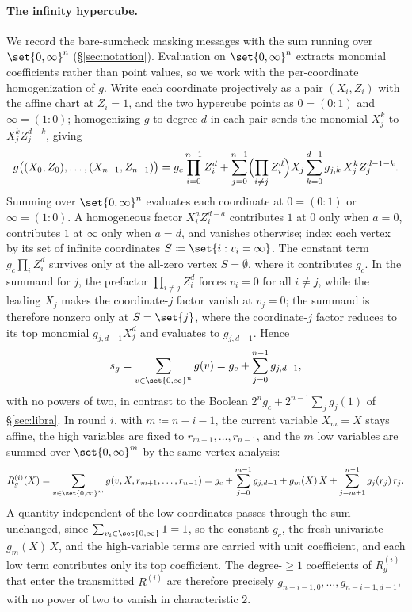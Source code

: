 \documentclass{article}
\theoremstyle{definition}
\begin{document}
\paragraph{The infinity hypercube.}
We record the bare-sumcheck masking messages with the sum running over $\set{0, \infty}^n$ (\S\ref{sec:notation}). Evaluation on $\set{0, \infty}^n$ extracts monomial coefficients rather than point values, so we work with the per-coordinate homogenization of $g$. Write each coordinate projectively as a pair $(X_i, Z_i)$ with the affine chart at $Z_i = 1$, and the two hypercube points as $0 = (0 : 1)$ and $\infty = (1 : 0)$; homogenizing $g$ to degree $d$ in each pair sends the monomial $X_j^{k}$ to $X_j^{k} Z_j^{d - k}$, giving
\[
  g\bigl( (X_0, Z_0), \ldots, (X_{n - 1}, Z_{n - 1}) \bigr) = g_c \prod_{i = 0}^{n - 1} Z_i^{d} + \sum_{j = 0}^{n - 1} \Bigl( \prod_{i \neq j} Z_i^{d} \Bigr) X_j \sum_{k = 0}^{d-1} g_{j, k}\, X_j^k Z_j^{d - 1 - k}.
\]
Summing over $\set{0, \infty}^n$ evaluates each coordinate at $0 = (0 : 1)$ or $\infty = (1 : 0)$. A homogeneous factor $X_i^{a} Z_i^{d - a}$ contributes $1$ at $0$ only when $a = 0$, contributes $1$ at $\infty$ only when $a = d$, and vanishes otherwise; index each vertex by its set of infinite coordinates $S \coloneqq \set{i : v_i = \infty}$. The constant term $g_c \prod_i Z_i^{d}$ survives only at the all-zero vertex $S = \emptyset$, where it contributes $g_c$. In the summand for $j$, the prefactor $\prod_{i \neq j} Z_i^{d}$ forces $v_i = 0$ for all $i \neq j$, while the leading $X_j$ makes the coordinate-$j$ factor vanish at $v_j = 0$; the summand is therefore nonzero only at $S = \set{j}$, where the coordinate-$j$ factor reduces to its top monomial $g_{j, d - 1} X_j^{d}$ and evaluates to $g_{j, d - 1}$. Hence
\[
  s_g = \sum_{v \in \set{0, \infty}^n} g(v) = g_c + \sum_{j = 0}^{n - 1} g_{j, d - 1},
\]
with no powers of two, in contrast to the Boolean $2^n g_c + 2^{n - 1} \sum_j g_j(1)$ of \S\ref{sec:libra}. In round $i$, with $m \coloneqq n - i - 1$, the current variable $X_m = X$ stays affine, the high variables are fixed to $r_{m + 1}, \ldots, r_{n - 1}$, and the $m$ low variables are summed over $\set{0, \infty}^m$ by the same vertex analysis:
\[
  R_g^{(i)}(X) = \sum_{v \in \set{0, \infty}^m} g(v, X, r_{m + 1}, \ldots, r_{n - 1}) = g_c + \sum_{j = 0}^{m - 1} g_{j, d - 1} + g_{m}(X)\, X + \sum_{j = m + 1}^{n - 1} g_j(r_j)\, r_j.
\]
A quantity independent of the low coordinates passes through the sum unchanged, since $\sum_{v_i \in \set{0, \infty}} 1 = 1$, so the constant $g_c$, the fresh univariate $g_m(X)\, X$, and the high-variable terms are carried with unit coefficient, and each low term contributes only its top coefficient. The degree-$\ge 1$ coefficients of $R_g^{(i)}$ that enter the transmitted $R^{(i)}$ are therefore precisely $g_{n - i - 1, 0}, \ldots, g_{n - i - 1, d - 1}$, with no power of two to vanish in characteristic $2$.
\end{document}
